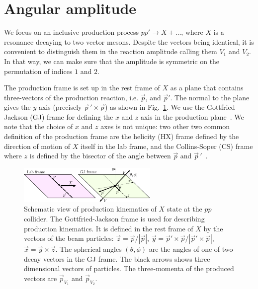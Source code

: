 \documentclass[prd,preprintnumbers,floatfix,
nofootinbib,superscriptaddress]{revtex4}
\begin{document}

\section{Angular amplitude} \label{sec:reaction.amplitude}
We focus on an inclusive production process $p p'\to X + \dots$, where $X$ is a resonance decaying to two vector mesons.
Despite the vectors being identical, it is convenient to distinguish them in the reaction amplitude calling them $V_1$ and $V_2$.
In that way, we can make sure that the amplitude is symmetric on the permutation of indices $1$ and $2$.

The production frame is set up in the rest frame of $X$ as a plane that contains three-vectors of the
production reaction, i.e. $\vec p$, and $\vec p'$. The normal to the plane gives the $y$ axis (precisely $\vec p\,'\times \vec p$) as shown in Fig.~\ref{fig:production}.
We use the Gottfried-Jackson (GJ) frame for defining the $x$ and $z$ axis in the production plane~\cite{Gottfried:1964nx}.
We note that the choice of $x$ and $z$ axes is not unique: two other two common definition of the production frame are the helicity (HX) frame
defined by the direction of motion of $X$ itself in the lab frame, and the Collins-Soper (CS) frame where $z$ is defined by the bisector of the angle between $\vec p$ and $\vec p\,'$~\cite{Faccioli:2010kd}.
\begin{figure}
  \includegraphics[width=0.6\textwidth]{production_GJ.pdf}
  \caption{Schematic view of production kinematics of $X$ state at the $pp$ collider.
  The Gottfried-Jackson frame is used for describing production kinematics.
  It is defined in the rest frame of $X$ by the vectors of the beam particles:
  $\vec z = \vec p / |\vec p|$, $\vec y = \vec p' \times \vec p / |\vec p' \times \vec p|$, $\vec x = \vec y \times \vec z$.
  The spherical angles $(\theta,\phi)$ are the angles of one of two decay vectors in the GJ frame.
  The black arrows shows three dimensional vectors of particles.
  The three-momenta of the produced vectors are $\vec p_{V_1}$ and $\vec p_{V_2}$.
  }
  \label{fig:production}
\end{figure}
\end{document}
